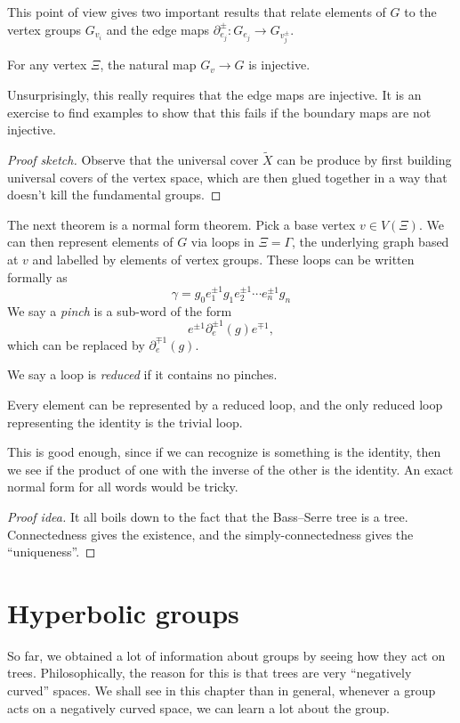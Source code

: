 \documentclass[a4paper]{article}
\begin{document}
This point of view gives two important results that relate elements of $G$ to the vertex groups $G_{v_i}$ and the edge maps $\partial_{e_j}^{\pm}: G_{e_j} \to G_{v_j^{\pm}}$.

\begin{lemma}
  For any vertex $\Xi$, the natural map $G_v \to G$ is injective.
\end{lemma}
Unsurprisingly, this really requires that the edge maps are injective. It is an exercise to find examples to show that this fails if the boundary maps are not injective.

\begin{proof}[Proof sketch]
  Observe that the universal cover $\tilde{X}$ can be produce by first building universal covers of the vertex space, which are then glued together in a way that doesn't kill the fundamental groups.
\end{proof}

The next theorem is a normal form theorem. Pick a base vertex $v \in V(\Xi)$. We can then represent elements of $G$ via loops in $\Xi = \Gamma$, the underlying graph based at $v$ and labelled by elements of vertex groups. These loops can be written formally as
\[
  \gamma = g_0 e_1^{\pm 1} g_1 e_2^{\pm 1} \cdots e_n^{\pm 1}g_n
\]
We say a \emph{pinch} is a sub-word of the form
\[
  e^{\pm 1} \partial_e^{\pm 1} (g) e^{\mp 1},
\]
which can be replaced by $\partial_e^{\mp 1}(g)$.

We say a loop is \emph{reduced} if it contains no pinches.

\begin{thm}
  Every element can be represented by a reduced loop, and the only reduced loop representing the identity is the trivial loop.
\end{thm}
This is good enough, since if we can recognize is something is the identity, then we see if the product of one with the inverse of the other is the identity. An exact normal form for all words would be tricky.

\begin{proof}[Proof idea]
  It all boils down to the fact that the Bass--Serre tree is a tree. Connectedness gives the existence, and the simply-connectedness gives the ``uniqueness''.
\end{proof}

\section{Hyperbolic groups}
So far, we obtained a lot of information about groups by seeing how they act on trees. Philosophically, the reason for this is that trees are very ``negatively curved'' spaces. We shall see in this chapter than in general, whenever a group acts on a negatively curved space, we can learn a lot about the group.
\end{document}
